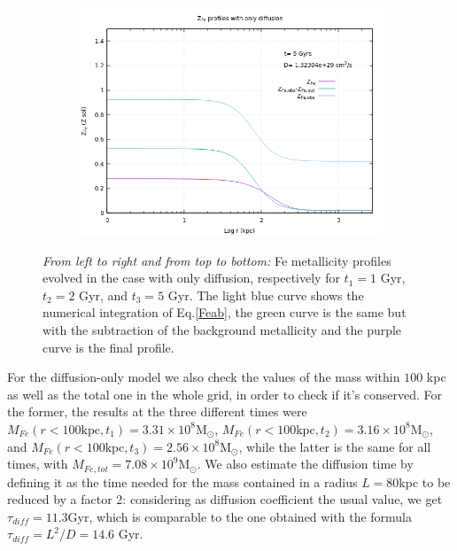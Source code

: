 \documentclass{article}
\begin{document}
\begin{figure} [H]
\begin{subfigure}{0.49\textwidth}
	\end{subfigure}
	\begin{subfigure}{0.49\textwidth}
		\includegraphics[width=0.9\linewidth]{Z_diff_5.png}
	\end{subfigure}
	\caption{\textit{From left to right and from top to bottom:} Fe metallicity profiles evolved in the case with only diffusion, respectively for $t_{1}=1 $ Gyr, $t_{2}=2$ Gyr, and $t_{3}=5$ Gyr. The light blue curve shows the numerical integration of Eq.\eqref{Feab}, the green curve is the same but with the subtraction of the background metallicity and the purple curve is the final profile.}
	\label{fig:Zdiffonly}
\end{figure}
For the diffusion-only model we also check the values of the mass within $100$ kpc as well as the total one in the whole grid, in order to check if it's conserved. For the former, the results at the three different times were $M_{Fe}(r<100\text{kpc},t_{1})=3.31\times10^{8}$M$_{\odot}$, $M_{Fe}(r<100\text{kpc},t_{2})=3.16\times10^{8}$M$_{\odot}$,
 and $M_{Fe}(r<100\text{kpc},t_{3})=2.56\times10^{8}$M$_{\odot}$, while the latter is the same for all times, with $M_{Fe,tot}=7.08\times10^{9}$M$_{\odot}$. 
 We also estimate the diffusion time by defining it as the time needed for the mass contained in a radius $L=80$kpc to be reduced by a factor 2: considering as diffusion coefficient the usual value, we get $\tau_{diff}=11.3$Gyr, which is comparable to the one obtained with the formula $\tau_{diff}=L^{2}/D=14.6$ Gyr. 
\end{document}
